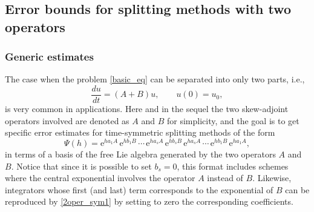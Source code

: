 \documentclass[11pt]{article}
\newcommand{\e}{\ensuremath{\mathrm{e}}}
\begin{document}
\subsection{Error bounds for splitting methods with two operators}

\subsubsection{Generic estimates}

The case when the problem \eqref{basic_eq} can be separated into only two parts, i.e.,
\begin{equation} \label{equ_2op}
 \frac{du}{dt} = (A + B) u, \qquad u(0) = u_0,
\end{equation}
 is very common in applications. Here and in the sequel the two skew-adjoint operators involved are denoted as $A$ and $B$ for simplicity, and the goal
 is to get specific error estimates for time-symmetric splitting methods of the form
\begin{equation} \label{2oper_sym1}
  \Psi(h) = \e^{h a_1 A} \, \e^{h b_1 B} \, \cdots \, \e^{h a_s  A} \, \e^{h b_s B} \, \e^{h a_s A} \, \cdots \, \e^{h b_1 B} \, \e^{h a_1 A},
\end{equation}
in terms of a basis of the free Lie algebra generated by the two operators $A$ and $B$. Notice that since it is possible to set $b_s = 0$, this format includes 
schemes where the central exponential involves the operator $A$  instead of $B$. Likewise, integrators whose first (and last) term corresponds to the exponential of $B$  can be
reproduced by \eqref{2oper_sym1} by setting to zero the corresponding coefficients.
\end{document}
